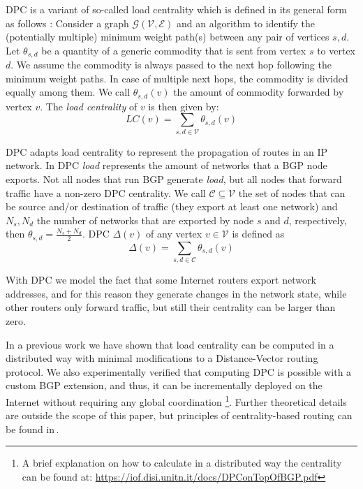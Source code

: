 \documentclass[10pt,conference,letterpaper]{IEEEtran}
\newcommand{\nodeset}{\ensuremath{\mathcal{V}}\xspace}
\newcommand{\destinationset}{\ensuremath{\mathcal{C}}\xspace}
\newcommand{\edgeset}{\ensuremath{\mathcal{E}}\xspace}
\newcommand{\graph}{\ensuremath{\mathcal{G(\nodeset,\edgeset)}}\xspace}
\newcommand{\pathset}{\ensuremath{\mathcal{C}}\xspace}
\newcommand{\dpc}{\ensuremath{\Delta}\xspace}
\begin{document}
\ac{DPC} is a variant of so-called load centrality which is defined in its general 
form as follows \cite{Brandes2008Variants}: Consider a graph \graph and an 
algorithm to identify the (potentially multiple) minimum weight path(s) between 
any pair of vertices $s,d$.
Let $\theta_{s,d}$ be a quantity of a generic commodity that is sent from vertex
$s$ to vertex $d$.
We assume the commodity is always passed to the next hop following the minimum weight paths.
In case of multiple next hops, the commodity is divided equally among them.
We call $\theta_{s,d}(v)$ the amount of  commodity forwarded by vertex $v$.
The \emph{load centrality} of $v$ is then given by:
\begin{equation}
LC(v) = \sum_{s,d \in \nodeset}\theta_{s,d}(v)
\label{eq:lc}
\end{equation}

\ac{DPC} adapts load centrality to represent the propagation of routes in an IP network. 
In \ac{DPC} \textit{load} represents the amount of networks that a BGP node exports. 
Not all nodes that run BGP generate \textit{load}, but all nodes that forward traffic 
have a non-zero DPC centrality. We call $\destinationset \subseteq \nodeset$ the 
set of nodes that can be source and/or destination of traffic (they export at least one network) 
and $N_s, N_d$ the number of networks that are exported by node $s$ and $d$, 
respectively, then $\theta_{s,d} = \frac{N_s + N_d}{2}$. \ac{DPC} $\Delta(v)$ of 
any vertex $v\in \nodeset$ is defined as
\begin{equation}
\dpc(v) = \sum_{s,d\in \pathset} \theta_{s,d} (v)
\label{eq:dpcv}
\end{equation}

With DPC we model the fact that some Internet routers export network addresses, 
and for this reason they generate changes in the network state, while other routers 
only forward traffic, but still their centrality can be larger than zero.

In a previous work we have shown that load centrality can be computed in a distributed 
way with minimal modifications to a Distance-Vector routing protocol. We also experimentally 
verified that computing \ac{DPC} is possible with a custom BGP extension, and thus, 
it can be incrementally deployed on the Internet without requiring any global 
coordination 
\footnote{A brief explanation on how to calculate in a distributed way the centrality 
can be found at: \url{https://iof.disi.unitn.it/docs/DPConTopOfBGP.pdf}}.
Further theoretical details are outside the scope of this paper, but principles 
of centrality-based routing can be found in\,\cite{MaLo18_ToN,GhiMa18_infocom}.
\end{document}
